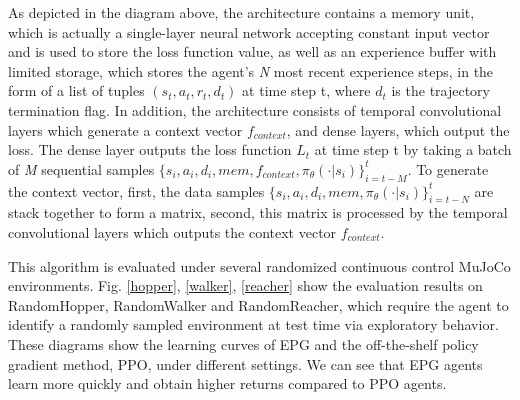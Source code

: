 \par
As depicted in the diagram above, the architecture contains a memory unit, which is actually a single-layer neural network accepting constant input vector and is used to store the loss function value, as well as an experience buffer with limited storage, which stores the agent's \textit{N} most recent experience steps, in the form of a list of tuples $(s_t,a_t,r_t,d_t)$ at time step t, where \textit{$d_t$} is the trajectory termination flag. In addition, the architecture consists of temporal convolutional layers which generate a context vector $f_{context}$, and dense layers, which output the loss. The dense layer outputs the loss function \textit{$L_t$} at time step t by taking a batch of \textit{M} sequential samples $\{{s_i,a_i,d_i},mem,f_{context},\pi_\theta(\cdot|s_i)\}^t_{i=t-M}$. To generate the context vector, first, the data samples $\{{s_i,a_i,d_i},mem,\pi_\theta(\cdot|s_i)\}^t_{i=t-N}$ are stack together to form a matrix, second, this matrix is processed by the temporal convolutional layers which outputs the context vector $f_{context}$.

\par
This algorithm is evaluated under several randomized continuous control MuJoCo environments. Fig. \ref{hopper}, \ref{walker}, \ref{reacher} show the evaluation results on RandomHopper, RandomWalker and RandomReacher, which require the agent to identify a randomly sampled environment at test time via exploratory behavior. These diagrams show the learning curves of EPG and the off-the-shelf policy gradient method, PPO, under different settings. We can see that EPG agents learn more quickly and obtain higher returns compared to PPO agents.

